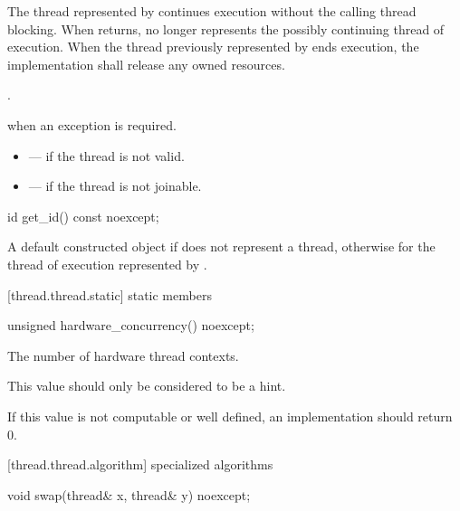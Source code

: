 \begin{itemdescr}
\pnum
\effects The thread represented by  continues execution without the calling thread
blocking. When  returns,  no longer represents the possibly continuing
thread of execution. When the thread previously represented by  ends execution, the
implementation shall release any owned resources.

\pnum\postconditions {}.

\pnum\throws {} when
an exception is required.

\pnum \errors
\begin{itemize}
\item {} --- if the thread is not valid.
\item {} --- if the thread is not joinable.
\end{itemize}
\end{itemdescr}

%
\begin{itemdecl}
id get_id() const noexcept;
\end{itemdecl}

\begin{itemdescr}
\pnum
\returns A default constructed  object if  does not represent a thread,
otherwise  for the thread of execution represented by
.
\end{itemdescr}

[thread.thread.static]{ static members}

%
\begin{itemdecl}
unsigned hardware_concurrency() noexcept;
\end{itemdecl}

\begin{itemdescr}
\pnum
\returns The number of hardware thread contexts. \begin{note} This value should
only be considered to be a hint. \end{note} If this value is not computable or
well defined, an implementation should return 0.
\end{itemdescr}

[thread.thread.algorithm]{ specialized algorithms}

%
\begin{itemdecl}
void swap(thread& x, thread& y) noexcept;
\end{itemdecl}

